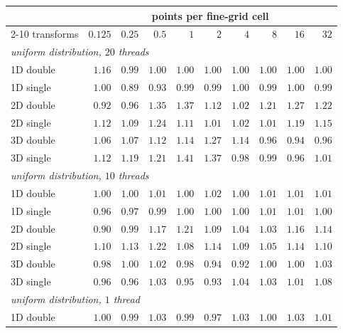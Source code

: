 \begin{table}[p]
    \centering
    \footnotesize
    \setlength{\tabcolsep}{4pt}
    \begin{tabular}{lrrrrrrrrr}
        \toprule
        & \multicolumn{9}{c}{points per fine-grid cell} \\
        \cmidrule(lr){2-10}
        transforms & $0.125$ & $0.25$ & $0.5$ & $1$ & $2$ & $4$ & $8$ & $16$ & $32$ \\
        \midrule
        \multicolumn{10}{l}{\emph{uniform distribution, $20$ threads}} \\
        1D double & $1.16$ & $0.99$ & $1.00$ & $1.00$ & $1.00$ & $1.00$ & $1.00$ & $1.00$ & $1.00$ \\
        1D single & $1.00$ & $0.89$ & $0.93$ & $0.99$ & $0.99$ & $1.00$ & $0.99$ & $1.00$ & $0.99$ \\
        2D double & $0.92$ & $0.96$ & $1.35$ & $1.37$ & $1.12$ & $1.02$ & $1.21$ & $1.27$ & $1.22$ \\
        2D single & $1.12$ & $1.09$ & $1.24$ & $1.11$ & $1.01$ & $1.02$ & $1.01$ & $1.19$ & $1.15$ \\
        3D double & $1.06$ & $1.07$ & $1.12$ & $1.14$ & $1.27$ & $1.14$ & $0.96$ & $0.94$ & $0.96$ \\
        3D single & $1.12$ & $1.19$ & $1.21$ & $1.41$ & $1.37$ & $0.98$ & $0.99$ & $0.96$ & $1.01$ \\
        \midrule
        \multicolumn{10}{l}{\emph{uniform distribution, $10$ threads}} \\
        1D double & $1.00$ & $1.00$ & $1.01$ & $1.00$ & $1.02$ & $1.00$ & $1.01$ & $1.01$ & $1.01$ \\
        1D single & $0.96$ & $0.97$ & $0.99$ & $1.00$ & $1.00$ & $1.00$ & $1.01$ & $1.01$ & $1.00$ \\
        2D double & $0.90$ & $0.99$ & $1.17$ & $1.21$ & $1.09$ & $1.04$ & $1.03$ & $1.16$ & $1.14$ \\
        2D single & $1.10$ & $1.13$ & $1.22$ & $1.08$ & $1.14$ & $1.09$ & $1.05$ & $1.14$ & $1.10$ \\
        3D double & $0.98$ & $1.00$ & $1.02$ & $0.98$ & $0.94$ & $0.92$ & $1.00$ & $1.00$ & $1.03$ \\
        3D single & $0.96$ & $0.96$ & $1.03$ & $0.95$ & $0.93$ & $1.04$ & $1.03$ & $1.01$ & $1.08$ \\
        \midrule
        \multicolumn{10}{l}{\emph{uniform distribution, $1$ thread}} \\
        1D double & $1.00$ & $0.99$ & $1.03$ & $0.99$ & $0.97$ & $1.03$ & $1.00$ & $1.03$ & $1.01$ \\

\end{tabular}
\end{table}
